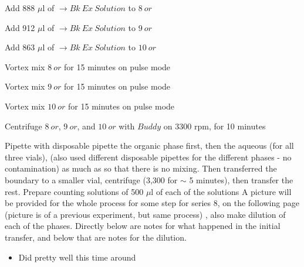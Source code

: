 \documentclass[idxtotoc,hyperref,openany,oneside]{labbook} %
\newcommand{\cmark}{\ding{51}}%
\newcommand{\done}{\rlap{$\square$}{\raisebox{2pt}{\large\hspace{1pt}\cmark}}%
  \hspace{-2.5pt}}
\begin{document}
\begin{todolist}
\item[\done]{Add 888 $\mu$l of $\boxed{\rightarrow Bk\ Ex\ Solution}$
  to $\boxed{8\ or}$}
\item[\done]{Add 912 $\mu$l of $\boxed{\rightarrow Bk\ Ex\ Solution}$
  to $\boxed{9\ or}$}
\item[\done]{Add 863 $\mu$l of $\boxed{\rightarrow Bk\ Ex\ Solution}$
  to $\boxed{10\ or}$}
\item[\done]{Vortex mix $\boxed{8\ or}$
  for 15 minutes on pulse mode}
\item[\done]{Vortex mix $\boxed{9\ or}$ for 15 minutes on pulse mode}
\item[\done]{Vortex mix $\boxed{10\ or}$ for 15 minutes on pulse mode}

\item[\done]{Centrifuge $\boxed{8\ or}$, $\boxed{9\ or}$,
  and $\boxed{10\ or}$
  with $\boxed{Buddy}$ on 3300 rpm, for 10 minutes}

\item[\done]{Pipette with disposable pipette the organic phase
  first, then the aqueous (for all three vials),
  (also used different disposable pipettes for the
  different phases - no contamination)
  as much as so that there is no mixing.
  Then transferred the boundary to a smaller vial,
  centrifuge (3,300 for $\sim$ 5 minutes), then transfer the rest.
  Prepare counting solutions of 500 $\mu$l of each of the solutions
  A picture will be provided for the whole process for
  some step for series 8,
  on the following page (picture is of a previous experiment,
  but same process)
  , also make dilution of each of the phases. Directly below
  are notes for what happened in the initial transfer,
  and below that are notes for the dilution.}
  \begin{itemize}
  \item{Did pretty well this time around}
  \end{itemize}
  

\end{todolist}
\end{document}
